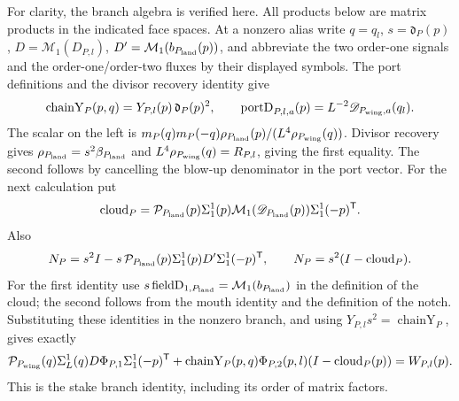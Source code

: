 For clarity, the branch algebra is verified here. All products below are
matrix products in the indicated face spaces. At a nonzero alias write
$q=q_l$, $s=\mathfrak d_P(p)$, $D=\mathcal M_1(D_{P,l})$, $D'=
\mathcal M_1(b_{P_{\rm land}}(p))$, and abbreviate the two order-one
signals and the order-one/order-two fluxes by their displayed symbols. The
port definitions and the divisor recovery identity give
\[
\operatorname{chainY}_P(p,q)
   =Y_{P,l}(p)\,\mathfrak d_P(p)^2,
\qquad
\operatorname{portD}_{P,l,a}(p)=L^{-2}\mathscr D_{P_{\rm wing},a}(q_l).
\]
The scalar on the left is
$m_P(q)m_P(-q)\rho_{P_{\rm land}}(p)/(L^4\rho_{P_{\rm wing}}(q))$.
Divisor recovery gives $\rho_{P_{\rm land}}=s^2\beta_{P_{\rm land}}$
and $L^4\rho_{P_{\rm wing}}(q)=R_{P,l}$, giving the first equality.
The second follows by cancelling the blow-up denominator in the port vector.
For the next calculation put
\[
 \operatorname{cloud}_P
 =\mathcal P_{P_{\rm land}}(p)\Sigma_1^1(p)
    \mathcal M_1(\mathscr D_{P_{\rm land}}(p))
    \Sigma_1^1(-p)^{\mathsf T}.
\] Also
\[
 N_P=s^2 I-s\,\mathcal P_{P_{\rm land}}(p)\Sigma_1^1(p)D'
                   \Sigma_1^1(-p)^{\mathsf T},
 \qquad
 N_P=s^2(I-\operatorname{cloud}_P).
\]
For the first identity use
$s\operatorname{fieldD}_{1,P_{\rm land}}=\mathcal M_1(b_{P_{\rm land}})$
in the definition of the cloud; the second follows from the mouth identity
and the definition of the notch. Substituting these identities in the
nonzero branch, and using $Y_{P,l}s^2=\operatorname{chainY}_P$, gives
exactly
\[
 \mathcal P_{P_{\rm wing}}(q)\Sigma_L^1(q)D\Phi_{P,1}
       \Sigma_1^1(-p)^{\mathsf T}
 +\operatorname{chainY}_P(p,q)\Phi_{P,2}(p,l)
       (I-\operatorname{cloud}_P(p))
 =W_{P,l}(p).
\]
This is the stake branch identity, including its order of matrix factors.

